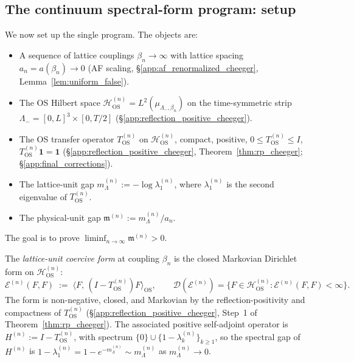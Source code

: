 \subsection{The continuum spectral-form program: setup}
\label{ssec:forms}

We now set up the single program. The objects are:
\begin{itemize}
\item A sequence of lattice couplings $\beta_{n}\to\infty$ with
lattice spacing $a_{n}=a(\beta_{n})\to 0$ (AF scaling,
\S\ref{app:af_renormalized_cheeger}, Lemma~\ref{lem:uniform_false}).
\item The OS Hilbert space
$\mathcal{H}_{\mathrm{OS}}^{(n)}=L^{2}(\mu_{\Lambda_{-},\beta_{n}})$
on the time-symmetric strip
$\Lambda_{-}=[0,L]^{3}\times[0,T/2]$
(\S\ref{app:reflection_positive_cheeger}).
\item The OS transfer operator $T_{\mathrm{OS}}^{(n)}$ on
$\mathcal{H}_{\mathrm{OS}}^{(n)}$, compact, positive,
$0\le T_{\mathrm{OS}}^{(n)}\le I$, $T_{\mathrm{OS}}^{(n)}\mathbf{1}
=\mathbf{1}$
(\S\ref{app:reflection_positive_cheeger},
Theorem~\ref{thm:rp_cheeger}; \S\ref{app:final_corrections}).
\item The lattice-unit gap
$m_{\Lambda}^{(n)}:=-\log\lambda_{1}^{(n)}$, where
$\lambda_{1}^{(n)}$ is the second eigenvalue of
$T_{\mathrm{OS}}^{(n)}$.
\item The physical-unit gap
$\mathfrak{m}^{(n)}:=m_{\Lambda}^{(n)}/a_{n}$.
\end{itemize}

The goal is to prove $\liminf_{n\to\infty}\mathfrak{m}^{(n)}>0$.

\begin{definition}
\label{def:lattice_coercive}
The \emph{lattice-unit coercive form} at coupling $\beta_{n}$ is
the closed Markovian Dirichlet form on
$\mathcal{H}_{\mathrm{OS}}^{(n)}$:
\begin{equation}
\label{eq:En_def}
  \mathcal{E}^{(n)}(F,F)
  \;:=\;\langle F,\,(I-T_{\mathrm{OS}}^{(n)})F\rangle_{\mathrm{OS}},
  \qquad
  \mathcal{D}(\mathcal{E}^{(n)})
  =\{F\in\mathcal{H}_{\mathrm{OS}}^{(n)}:
  \mathcal{E}^{(n)}(F,F)<\infty\}.
\end{equation}
The form is non-negative, closed, and Markovian by the
reflection-positivity and compactness of $T_{\mathrm{OS}}^{(n)}$
(\S\ref{app:reflection_positive_cheeger}, Step~1 of
Theorem~\ref{thm:rp_cheeger}). The associated positive self-adjoint
operator is $H^{(n)}:=I-T_{\mathrm{OS}}^{(n)}$, with spectrum
$\{0\}\cup\{1-\lambda_{k}^{(n)}\}_{k\ge 1}$, so the spectral gap of
$H^{(n)}$ is $1-\lambda_{1}^{(n)}=1-e^{-m_{\Lambda}^{(n)}}\sim
m_{\Lambda}^{(n)}$ as $m_{\Lambda}^{(n)}\to 0$.
\end{definition}

